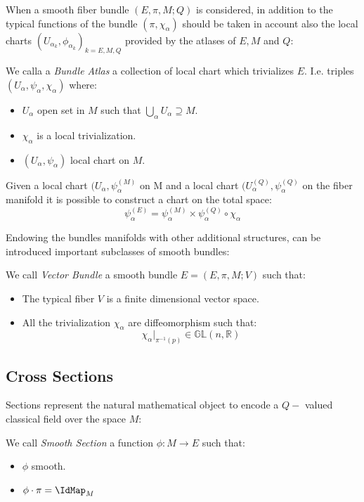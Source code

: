 \documentclass[Main]{subfiles}
\begin{document}
			When a smooth fiber bundle $(E,\pi,M;Q)$ is considered, in addition to the typical functions of the bundle $(\pi, \chi_{\alpha})$ should be taken in account also  the local charts $(U_{\alpha_k}, \phi_{\alpha_k})_{k = E,M,Q}$ provided by the atlases of $E,M$ and $Q$:
			\begin{definition}
				We calla a \emph{Bundle Atlas} a collection of local chart which trivializes $E$. I.e. triples  $(U_\alpha, \psi_\alpha, \chi_\alpha)$ where:
				\begin{itemize}
					\item $U_\alpha$ open set in $M$ such that $\bigcup_{\alpha} U_{\alpha} \supseteq M$.
					\item $\chi_\alpha$  is a local trivialization.
					\item $(U_\alpha,\psi_\alpha)$ local chart on $M$.
				\end{itemize}		
			\end{definition}
			\begin{observation}
				Given a local chart $(U_\alpha, \psi_\alpha^{(M)}$ on M and a local chart $(U_\alpha^{(Q)}, \psi_\alpha^{(Q)}$ on the fiber manifold it is possible to construct a chart on the total space:	
				\begin{displaymath}
							\psi^{(E)}_\alpha = \psi_\alpha^{(M)} \times  \psi_\alpha^{(Q)} \circ \chi_\alpha
				\end{displaymath}	
			\end{observation}
			
			Endowing the bundles manifolds with other additional structures, can be introduced important subclasses of smooth bundles:
			\begin{definition}
				We call \emph{Vector Bundle} a smooth bundle $E=(E,\pi,M;V)$ such that:
				\begin{itemize}
					\item The typical fiber $V$ is a finite dimensional vector space.	
					\item All the trivialization $\chi_{\alpha} $ are diffeomorphism such that:
						\begin{displaymath}
							\chi_{\alpha}\vert_{\pi^{-1}(p)} \in \mathbb{GL}(n, \mathbb{R})
						\end{displaymath}
				\end{itemize}
			\end{definition}

		\subsection{Cross Sections}
			Sections represent the natural mathematical object to encode a $Q-$ valued classical field over the space $M$:			
			\begin{definition}
				We call \emph{Smooth Section} a function $\phi : M \rightarrow E$ such that:
					\begin{itemize}
						\item $\phi$ smooth.
						\item $\phi \cdot \pi = \IdMap_M$ 
					\end{itemize}
			\end{definition}
			
\end{document}
